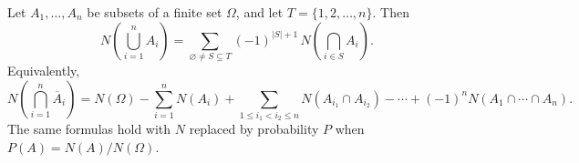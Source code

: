 Let $A_1, \ldots, A_n$ be subsets of a finite set $\Omega$, and let $T = \{1, 2, \ldots, n\}$. Then
$$N\!\left(\bigcup_{i=1}^{n} A_i\right) = \sum_{\varnothing \neq S \subseteq T} (-1)^{|S|+1} \, N\!\left(\bigcap_{i \in S} A_i\right).$$
Equivalently,
$$N\!\left(\bigcap_{i=1}^{n} \overline{A}_i\right) = N(\Omega) - \sum_{i=1}^{n} N(A_i) + \sum_{1 \leq i_1 < i_2 \leq n} N(A_{i_1} \cap A_{i_2}) - \cdots + (-1)^n N(A_1 \cap \cdots \cap A_n).$$
The same formulas hold with $N$ replaced by probability $P$ when $P(A) = N(A)/N(\Omega)$.
